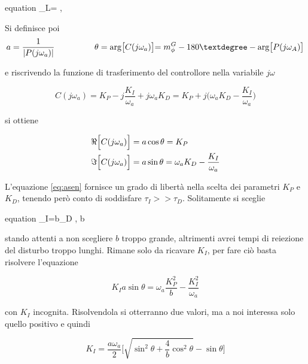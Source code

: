 		\begin{empheq}[box=%
		\fbox]{equation}
			\tau_L=\alpha{} \singleSpacing, \trippleSpacing {}\le\alpha\le{}
			\label{eq:tauL}
		\end{empheq}
		
		\noindent Si definisce poi 
		\begin{equation}
			a=\frac{1}{|P(j\omega_a)|} \trippleSpacing \trippleSpacing \trippleSpacing \theta=\arg\bigl[C(j\omega_a)\bigl]=m_{\phi}^G-180°-\arg\bigl[P(j\omega_A)\bigl]
		\end{equation}
	
		\noindent e riscrivendo la funzione di trasferimento del controllore nella variabile $j\omega$
		
		\begin{equation}
			C(j\omega_a)=K_P-j\frac{K_I}{\omega_a}+j\omega_aK_D=K_P+j\bigl(\omega_aK_D-\frac{K_I}{\omega_a}\bigl)
		\end{equation}
		
		\noindent si ottiene
		
		\begin{align}
			\Re\Bigl[C(j\omega_a)\Bigl] &= a\cos\theta=K_P \\
			\Im\Bigl[C(j\omega_a)\Bigl] &= a\sin\theta=\omega_aK_D-\frac{K_I}{\omega_a}
			\label{eq:asen}
		\end{align}
	
		\noindent L'equazione \ref{eq:asen} fornisce un grado di libertà nella scelta dei parametri $K_P$ e $K_D$, tenendo però conto di soddisfare $\tau_I>>\tau_D$. Solitamente si sceglie 
		
		\begin{empheq}[box=%
		\fbox]{equation}
			\tau_I=b\tau_D \singleSpacing, \trippleSpacing b
		\end{empheq}
	
		\noindent stando attenti a non scegliere $b$ troppo grande, altrimenti avrei tempi di reiezione del disturbo troppo lunghi. Rimane solo da ricavare $K_I$, per fare ciò basta risolvere l'equazione
		
		\begin{equation}
			K_Ia\sin\theta=\omega_a\frac{K_P^2}{b}-\frac{K_I^2}{\omega_a}
		\end{equation}
	
		\noindent con $K_I$ incognita. Risolvendola si otterranno due valori, ma a noi interessa solo quello positivo e quindi
		
		\begin{equation}
			K_I=\frac{a\omega_a}{2}\Biggl[\sqrt{\sin^2\theta+\frac{4}{b}\cos^2\theta}-\sin\theta\Biggl]
		\end{equation}
		
